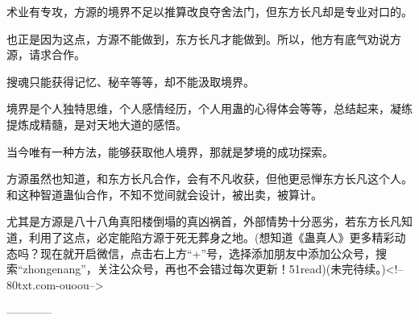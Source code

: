 \begin{this_body}
术业有专攻，方源的境界不足以推算改良夺舍法门，但东方长凡却是专业对口的。

也正是因为这点，方源不能做到，东方长凡才能做到。所以，他方有底气劝说方源，请求合作。

搜魂只能获得记忆、秘辛等等，却不能汲取境界。

境界是个人独特思维，个人感情经历，个人用蛊的心得体会等等，总结起来，凝练提炼成精髓，是对天地大道的感悟。

当今唯有一种方法，能够获取他人境界，那就是梦境的成功探索。

方源虽然也知道，和东方长凡合作，会有不凡收获，但他更忌惮东方长凡这个人。和这种智道蛊仙合作，不知不觉间就会设计，被出卖，被算计。

尤其是方源是八十八角真阳楼倒塌的真凶祸首，外部情势十分恶劣，若东方长凡知道，利用了这点，必定能陷方源于死无葬身之地。(想知道《蛊真人》更多精彩动态吗？现在就开启微信，点击右上方“+”号，选择添加朋友中添加公众号，搜索“zhongenang”，关注公众号，再也不会错过每次更新！51read)(未完待续。)<!--80txt.com-ouoou-->

------------

\end{this_body}


